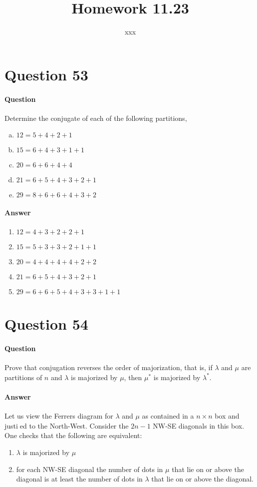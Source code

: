 \documentclass[UTF8]{article}
\title{Homework 11.23}
\author{xxx}
\date{}
\begin{document}
\maketitle
\section{Question 53}
\paragraph{Question}
Determine the conjugate of each of the following
partitions,
\begin{enumerate}[(a)]
    \item $ 12 = 5 + 4 + 2 + 1 $
    \item $ 15 = 6 + 4 + 3 + 1 + 1 $
    \item $ 20 = 6 + 6 + 4 + 4 $
    \item $ 21 = 6 + 5 + 4 + 3 + 2 + 1 $
    \item $ 29 = 8 + 6 + 6 + 4 + 3 + 2 $
\end{enumerate}
\paragraph{Answer}
    \begin{enumerate}
        \item $ 12 = 4 + 3 + 2 + 2 + 1 $
        \item $ 15 = 5 + 3 + 3 + 2 + 1 + 1 $
        \item $ 20 = 4 + 4 + 4 + 4 + 2 + 2 $
        \item $ 21 = 6 + 5 + 4 + 3 + 2 + 1 $
        \item $ 29 = 6 + 6 + 5 + 4 + 3 + 3 + 1 + 1 $
    \end{enumerate}


\section{Question 54}
\paragraph{Question}
Prove that conjugation reverses the order of majorization,
that is, if $ \lambda $ and $ \mu $ are partitions of $ n $ and $ \lambda $ is majorized by $ \mu $, then $ \mu^{*} $ is majorized
by $ \lambda^{*} $.
\paragraph{Answer}
Let us view the Ferrers diagram for $ \lambda $ and $ \mu $ as contained in a $ n \times n $ box and justied
to the North-West. Consider the $ 2n - 1 $ NW-SE diagonals in this box. One checks that the following are equivalent:
\begin{enumerate}[i]
    \item $ \lambda $ is majorized by $ \mu $
    \item for each NW-SE diagonal the number of dots in $ \mu $ that lie on or above the diagonal is
    at least the number of dots in $ \lambda $ that lie on or above the diagonal.
\end{enumerate}
\end{document}
